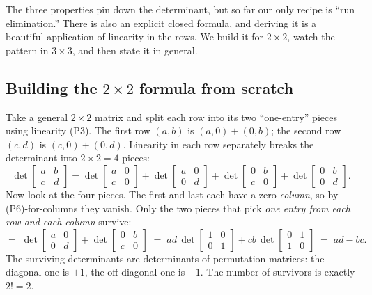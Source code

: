The three properties pin down the determinant, but so far our only recipe is ``run elimination.'' There is also an explicit closed formula, and deriving it is a beautiful application of linearity in the rows. We build it for $2\times 2$, watch the pattern in $3\times 3$, and then state it in general.

\subsection{Building the \texorpdfstring{$2\times 2$}{2x2} formula from scratch}

Take a general $2\times 2$ matrix and split each row into its two ``one-entry'' pieces using linearity (P3). The first row $(a,b)$ is $(a,0)+(0,b)$; the second row $(c,d)$ is $(c,0)+(0,d)$. Linearity in each row separately breaks the determinant into $2\times 2 = 4$ pieces:
\[
\det\begin{bmatrix} a & b \\ c & d\end{bmatrix}
=\det\begin{bmatrix} a & 0 \\ c & 0\end{bmatrix}
+\det\begin{bmatrix} a & 0 \\ 0 & d\end{bmatrix}
+\det\begin{bmatrix} 0 & b \\ c & 0\end{bmatrix}
+\det\begin{bmatrix} 0 & b \\ 0 & d\end{bmatrix}.
\]
Now look at the four pieces. The first and last each have a zero \emph{column}, so by (P6)-for-columns they vanish. Only the two pieces that pick \emph{one entry from each row and each column} survive:
\[
=\;\det\begin{bmatrix} a & 0 \\ 0 & d\end{bmatrix}
+\det\begin{bmatrix} 0 & b \\ c & 0\end{bmatrix}
\;=\; ad\,\det\!\begin{bmatrix} 1 & 0 \\ 0 & 1\end{bmatrix}
+ cb\,\det\!\begin{bmatrix} 0 & 1 \\ 1 & 0\end{bmatrix}
\;=\; ad - bc .
\]
The surviving determinants are determinants of permutation matrices: the diagonal one is $+1$, the off-diagonal one is $-1$. The number of survivors is exactly $2!=2$.

